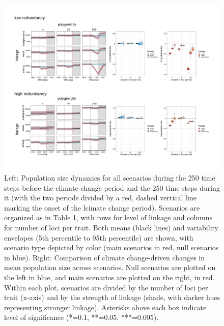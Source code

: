 \documentclass[9pt,twocolumn,twoside,lineno]{pnas-new}
\begin{document}
\begin{figure}[\sidecaptionrelwidth][t]
\centering
\includegraphics[width=17.8cm]{Nt_time_series_and_boxplots.jpg}
\caption{Left: Population size dynamics for all scenarios during the 250 time steps before the climate change period and the 250 time steps during it (with the two periods divided by a red, dashed vertical line marking the onset of the lcimate change period). Scenarios are organized as in Table 1, with rows for level of linkage and columns for number of loci per trait. Both means (black lines) and variability envelopes (5th percentile to 95th percentile) are shown, with scenario type depicted by color (main scenarios in red, null scenarios in blue). Right: Comparison of climate change-driven changes in mean population size across scenarios. Null scenarios are plotted on the left in blue, and main scenarios are plotted on the right, in red. Within each plot, scenarios are divided by the number of loci per trait (x-axis) and by the strength of linkage (shade, with darker hues representing stronger linkage). Asterisks above each box indicate level of significance (*=0.1, **=0.05, ***=0.005).}
\label{fig:Nt_over_time_and_boxplots}
\end{figure}
\end{document}

